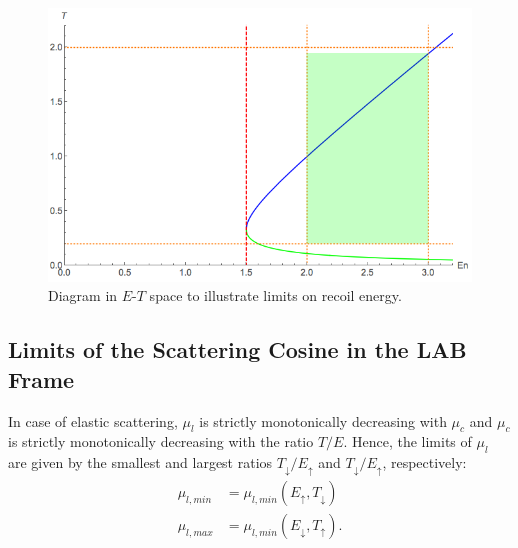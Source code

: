 \documentclass[review]{elsarticle}
\begin{document}
\begin{figure}
	\centering
	\includegraphics[width=1.0\linewidth]{energy_boundaries.png}
	\caption{Diagram in $E$-$T$ space to illustrate limits on recoil energy.}
	\label{fig:energy_boundaries}
\end{figure}

\subsection{Limits of the Scattering Cosine in the LAB Frame}\label{sec:mu_L_limits}
In case of elastic scattering, $\mu_l$ is strictly monotonically decreasing with $\mu_c$ and $\mu_c$ is strictly monotonically decreasing with the ratio $T/E$. Hence, the limits of $\mu_l$ are given by the smallest and largest ratios
$T_{\downarrow}/E_{\uparrow}$ and $T_{\downarrow}/E_{\uparrow}$, respectively:
\begin{align}
  \mu_{l,min} &= \mu_{l,min}(E_{\uparrow},T_{\downarrow}) \nonumber \\
  \mu_{l,max} &= \mu_{l,min}(E_{\downarrow},T_{\uparrow}).
\end{align}
\end{document}

